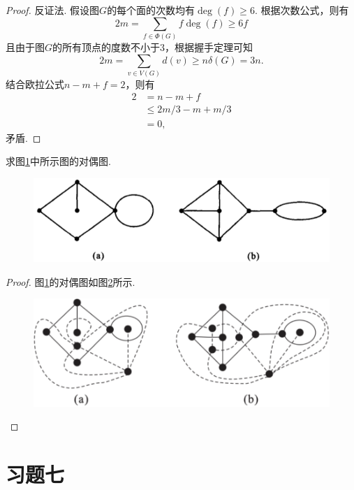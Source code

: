 \documentclass[cn,blue,normal,founder,11pt]{elegantnote}
\begin{document}
\begin{proof}
	反证法. 假设图\(G\)的每个面的次数均有\(\deg(f)\geqslant 6\). 根据次数公式，则有
	\[2m=\sum_{f\in \Phi(G)}f\deg(f)\geqslant 6f\]
	且由于图\(G\)的所有顶点的度数不小于\(3\)，根据握手定理可知
	\[2m=\sum_{v\in V(G)}d(v)\geqslant n\delta(G)=3n.\]
	结合欧拉公式\(n-m+f=2\)，则有
	\begin{align*}
		2&=n-m+f\\
		&\leqslant 2m/3-m+m/3\\
		&=0,
	\end{align*}
	矛盾.
\end{proof}

\begin{example}
		求图\ref{fig:6.1}中所示图的对偶图.
		\begin{figure}[H]
			\centering
			\includegraphics[scale=0.775]{image/ex20.pdf}
			\caption{}
			\label{fig:6.1}
		\end{figure}
\end{example}

\begin{proof}
	图\ref{fig:6.1}的对偶图如图\ref{fig:6.1_jie}所示.
	\begin{figure}[H]
		\centering
		\includegraphics[scale=0.65]{image/ex20_jie.pdf}
		\caption{}
		\label{fig:6.1_jie}
	\end{figure}
\end{proof}

\section{习题七}
\end{document}
